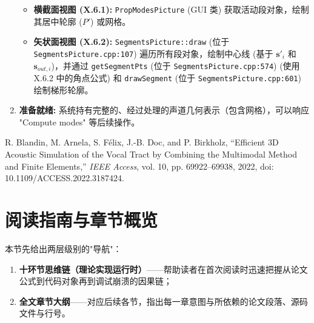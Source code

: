 \documentclass{ctexart}
\begin{document}
\begin{enumerate}
        \begin{itemize}
            \item \textbf{横截面视图 (X.6.1):} \texttt{PropModesPicture} (GUI 类) 获取活动段对象，绘制其居中轮廓 (\(P'\)) 或网格。
            \item \textbf{矢状面视图 (X.6.2):} \texttt{SegmentsPicture::draw} (位于 \texttt{SegmentsPicture.cpp:107}) 遍历所有段对象，绘制中心线 (基于 \({\mathbf{s}'}_i\) 和 \(\mathbf{s}_{out,i}\))，并通过 \texttt{getSegmentPts} (位于 \texttt{SegmentsPicture.cpp:574}) (使用 X.6.2 中的角点公式) 和 \texttt{drawSegment} (位于 \texttt{SegmentsPicture.cpp:601}) 绘制梯形轮廓。
        \end{itemize}
    \item \textbf{准备就绪:} 系统持有完整的、经过处理的声道几何表示（包含网格），可以响应 "Compute modes" 等后续操作。
\end{enumerate}

\begin{thebibliography}{9}
    R. Blandin, M. Arnela, S. Félix, J.-B. Doc, and P. Birkholz, ``Efficient 3D Acoustic Simulation of the Vocal Tract by Combining the Multimodal Method and Finite Elements,'' \textit{IEEE Access}, vol. 10, pp. 69922--69938, 2022, doi: 10.1109/ACCESS.2022.3187424.
\end{thebibliography}

\section{阅读指南与章节概览}
\label{sec:roadmap}
本节先给出两层级别的"导航"：
\begin{enumerate}
    \item \textbf{十环节思维链（理论\textrightarrow{}实现\textrightarrow{}运行时）}——帮助读者在首次阅读时迅速把握从论文公式到代码对象再到调试崩溃的因果链；
    \item \textbf{全文章节大纲}——对应后续各节，指出每一章意图与所依赖的论文段落、源码文件与行号。
\end{enumerate}
\end{document}
